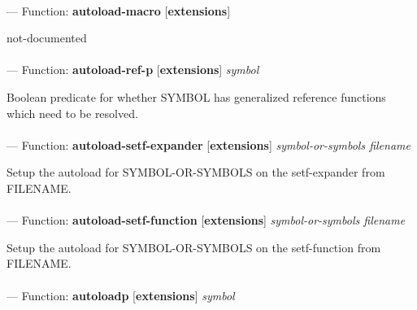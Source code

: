 \paragraph{}
\label{EXTENSIONS:AUTOLOAD-MACRO}
--- Function: \textbf{autoload-macro} [\textbf{extensions}] \textit{}

\begin{adjustwidth}{5em}{5em}
not-documented
\end{adjustwidth}

\paragraph{}
\label{EXTENSIONS:AUTOLOAD-REF-P}
--- Function: \textbf{autoload-ref-p} [\textbf{extensions}] \textit{symbol}

\begin{adjustwidth}{5em}{5em}
Boolean predicate for whether SYMBOL has generalized reference functions which need to be resolved.
\end{adjustwidth}

\paragraph{}
\label{EXTENSIONS:AUTOLOAD-SETF-EXPANDER}
--- Function: \textbf{autoload-setf-expander} [\textbf{extensions}] \textit{symbol-or-symbols filename}

\begin{adjustwidth}{5em}{5em}
Setup the autoload for SYMBOL-OR-SYMBOLS on the setf-expander from FILENAME.
\end{adjustwidth}

\paragraph{}
\label{EXTENSIONS:AUTOLOAD-SETF-FUNCTION}
--- Function: \textbf{autoload-setf-function} [\textbf{extensions}] \textit{symbol-or-symbols filename}

\begin{adjustwidth}{5em}{5em}
Setup the autoload for SYMBOL-OR-SYMBOLS on the setf-function from FILENAME.
\end{adjustwidth}

\paragraph{}
\label{EXTENSIONS:AUTOLOADP}
--- Function: \textbf{autoloadp} [\textbf{extensions}] \textit{symbol}

